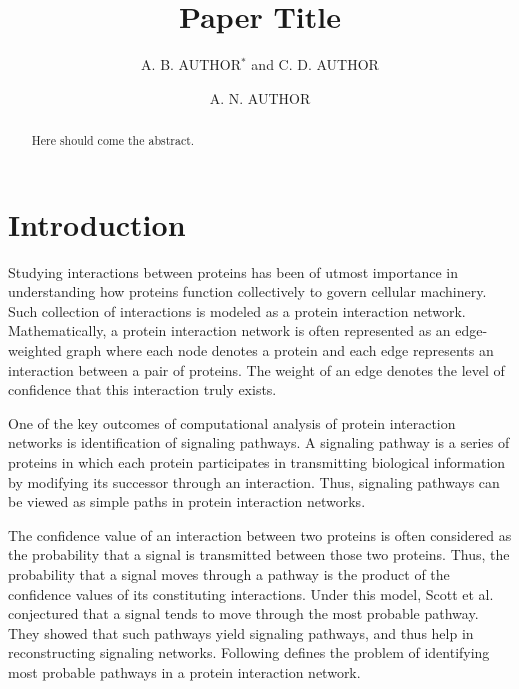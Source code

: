 \documentclass{ws-procs11x85}
\begin{document}
\title{Paper Title}

\author{A. B. AUTHOR$^*$ and C. D. AUTHOR}

\address{University Department, University Name,\\
City, State ZIP/Zone, Country\\
$^*$E-mail: ab\_author@university.com\\
www.university\_name.edu}

\author{A. N. AUTHOR}
 
\address{Group, Laboratory, Street,\\
City, State ZIP/Zone, Country\\
E-mail: an\_author@laboratory.com}

\begin{abstract}
Here should come the abstract.
\end{abstract}


\bodymatter

\section{Introduction} 

Studying interactions between proteins has been of utmost importance in
understanding how proteins function collectively to govern cellular
machinery\cite{schwikowski,uetz}. Such collection of interactions is modeled as
a protein interaction network. Mathematically, a protein interaction network is
often represented as an edge-weighted graph where each node denotes a protein
and each edge represents an interaction between a pair of proteins. The weight
of an edge denotes the level of confidence that this interaction truly exists.

One of the key outcomes of computational analysis of protein interaction
networks is identification of signaling pathways. A signaling pathway is a
series of proteins in which each protein participates in transmitting
biological information by modifying its successor through an
interaction. Thus, signaling pathways can be viewed as simple paths in protein
interaction networks\cite{kelley}.

The confidence value of an interaction between two proteins is often considered
as the probability that a signal is transmitted between those two proteins.
Thus, the probability that a signal moves through a pathway is the product of
the confidence values of its constituting interactions. Under this model, Scott
et al. conjectured that a signal tends to move through the most probable
pathway\cite{scott}. They showed that such pathways yield signaling pathways,
and thus help in reconstructing signaling networks. Following defines the
problem of identifying most probable pathways in a protein interaction network.
\end{document}

